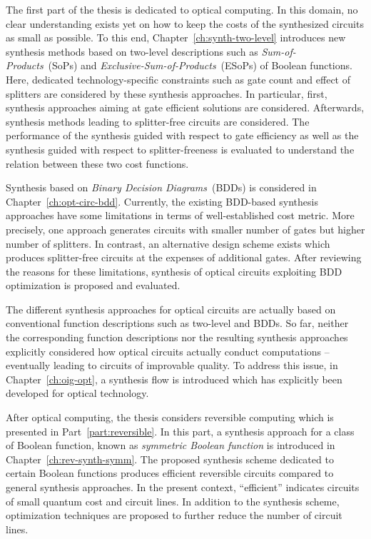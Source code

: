 \documentclass[10pt,letterpaper,twoside,openright]{book}
\begin{document}
The first part of the thesis is dedicated to optical computing. In this domain, no clear understanding exists yet on how to keep the costs of the synthesized circuits as small as possible. To this end, Chapter~\ref{ch:synth-two-level} introduces new synthesis methods based on two-level descriptions such as {\em Sum-of-Products}~(SoPs) and {\em Exclusive-Sum-of-Products}~(ESoPs) of Boolean functions. Here, dedicated technology-specific constraints such as gate count and effect of splitters are considered by these synthesis approaches. In particular, first, synthesis approaches aiming at gate efficient solutions are considered. Afterwards, synthesis methods leading to splitter-free circuits are considered. The performance of the synthesis guided with respect to gate efficiency as well as
the synthesis guided with respect to splitter-freeness is evaluated to understand the relation between these two cost functions. 

Synthesis based on {\em Binary Decision Diagrams}~(BDDs) is considered in Chapter~\ref{ch:opt-circ-bdd}. Currently, the existing BDD-based synthesis approaches have some limitations in terms of well-established cost metric. More precisely, one approach generates circuits with smaller number of gates but higher number of splitters. In contrast, an alternative design scheme exists which produces splitter-free circuits at the expenses of additional gates.  After reviewing the reasons for these limitations, synthesis of optical circuits exploiting BDD optimization is proposed and evaluated.        

The different synthesis approaches for optical circuits are actually based on conventional function descriptions such as two-level and BDDs. So far, neither the corresponding function descriptions nor the resulting synthesis approaches explicitly considered how optical circuits actually conduct computations  -- eventually leading to circuits of improvable quality. To address this issue, in Chapter~\ref{ch:oig-opt}, a synthesis flow is introduced which has explicitly been developed for optical technology.  

After optical computing, the thesis considers reversible computing which is presented in Part~\ref{part:reversible}. In this part, a synthesis approach for a class of Boolean function, known as \emph{symmetric Boolean function} is introduced in Chapter~\ref{ch:rev-synth-symm}. The proposed synthesis scheme dedicated to certain Boolean functions produces efficient reversible circuits compared to general synthesis approaches. In the present context, \enquote{efficient} indicates circuits of small quantum cost and circuit lines. In addition to the synthesis scheme, optimization techniques are proposed to further reduce the number of circuit lines.
\end{document}
